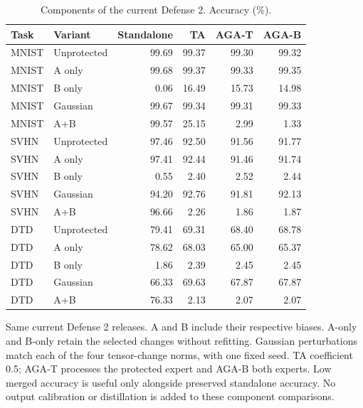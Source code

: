 \begin{table}[t]
\centering\small
\setlength{\tabcolsep}{4pt}
\caption{Components of the current Defense 2. Accuracy (\%).}
\label{tab:defense2_components}
\begin{tabular}{@{}llrrrr@{}}
\toprule
Task & Variant & Standalone & TA & AGA-T & AGA-B \\
\midrule
MNIST & Unprotected & 99.69 & 99.37 & 99.30 & 99.32 \\
MNIST & A only & 99.68 & 99.37 & 99.33 & 99.35 \\
MNIST & B only & 0.06 & 16.49 & 15.73 & 14.98 \\
MNIST & Gaussian & 99.67 & 99.34 & 99.31 & 99.33 \\
MNIST & A+B & 99.57 & 25.15 & 2.99 & 1.33 \\
\midrule
SVHN & Unprotected & 97.46 & 92.50 & 91.56 & 91.77 \\
SVHN & A only & 97.41 & 92.44 & 91.46 & 91.74 \\
SVHN & B only & 0.55 & 2.40 & 2.52 & 2.44 \\
SVHN & Gaussian & 94.20 & 92.76 & 91.81 & 92.13 \\
SVHN & A+B & 96.66 & 2.26 & 1.86 & 1.87 \\
\midrule
DTD & Unprotected & 79.41 & 69.31 & 68.40 & 68.78 \\
DTD & A only & 78.62 & 68.03 & 65.00 & 65.37 \\
DTD & B only & 1.86 & 2.39 & 2.45 & 2.45 \\
DTD & Gaussian & 66.33 & 69.63 & 67.87 & 67.87 \\
DTD & A+B & 76.33 & 2.13 & 2.07 & 2.07 \\
\bottomrule
\end{tabular}
\par\smallskip
\begin{minipage}{\textwidth}\footnotesize Same current Defense 2 releases. A and B include their respective biases. A-only and B-only retain the selected changes without refitting. Gaussian perturbations match each of the four tensor-change norms, with one fixed seed. TA coefficient 0.5; AGA-T processes the protected expert and AGA-B both experts. Low merged accuracy is useful only alongside preserved standalone accuracy. No output calibration or distillation is added to these component comparisons.\end{minipage}
\end{table}
